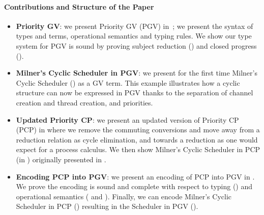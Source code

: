 \documentclass[main.tex]{subfiles}
\begin{document}
\paragraph*{Contributions and Structure of the Paper}
\begin{itemize}
\item \textbf{Priority GV}: we present Priority GV (PGV) in~; we present the syntax of types and terms, operational semantics and typing rules. We show our type system for PGV is sound by proving subject reduction () and closed progress ().
\item \textbf{Milner's Cyclic Scheduler in PGV}: we present for the first time Milner's Cyclic Scheduler \cite{milner89} () as a GV term. This example illustrates how a cyclic structure can now be expressed in PGV thanks to the separation of channel creation and thread creation, and priorities.
\item \textbf{Updated Priority CP}: we present an updated version of Priority CP (PCP) \cite{dardhagay18} in  where we remove the commuting conversions and move away from a reduction relation as cycle elimination, and towards a reduction as one would expect for a process calculus. We then show Milner's Cyclic Scheduler in PCP (in ) originally presented in \cite{dardhagay18}.
\item \textbf{Encoding PCP into PGV}: we present an encoding of PCP into PGV in . We prove the encoding is sound and complete with respect to typing () and operational semantics ( and ). Finally, we can encode Milner's Cyclic Scheduler in PCP () resulting in the Scheduler in PGV ().
\end{itemize}
\end{document}

